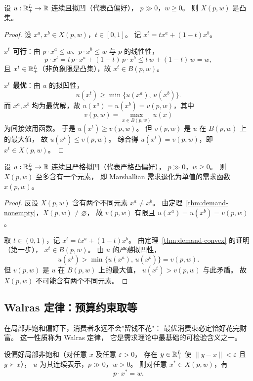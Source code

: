 \begin{theorem}[凸偏好下需求对应为凸集]\label{thm:demand-convex}
设 $u:\mathbb{R}^L_+\to\mathbb{R}$ 连续且拟凹（代表凸偏好），
$p\gg 0$，$w\ge 0$。
则 $X(p,w)$ 是凸集。
\end{theorem}

\begin{proof}
设 $x^a, x^b\in X(p,w)$，$t\in[0,1]$。
记 $x^t=tx^a+(1-t)x^b$。

\textbf{$x^t$ 可行}：由 $p\cdot x^a\le w$、$p\cdot x^b\le w$ 与 $p$ 的线性性，
\[
  p\cdot x^t = t\,p\cdot x^a + (1-t)\,p\cdot x^b \le t\,w+(1-t)\,w = w,
\]
且 $x^t\in\mathbb{R}^L_+$（非负象限是凸集），故 $x^t\in B(p,w)$。

\textbf{$x^t$ 最优}：由 $u$ 的拟凹性，
\[
  u(x^t) \ge \min\bigl\{u(x^a),\,u(x^b)\bigr\}.
\]
而 $x^a, x^b$ 均为最优解，故 $u(x^a)=u(x^b)=v(p,w)$，其中
\[
  v(p,w)=\max_{x\in B(p,w)}u(x)
\]
为间接效用函数。
于是 $u(x^t)\ge v(p,w)$。
但 $v(p,w)$ 是 $u$ 在 $B(p,w)$ 上的最大值，
故 $u(x^t)\le v(p,w)$。
综合得 $u(x^t)=v(p,w)$，即 $x^t\in X(p,w)$。
\end{proof}

\begin{theorem}[严格凸偏好下需求唯一]\label{thm:demand-unique}
设 $u:\mathbb{R}^L_+\to\mathbb{R}$ 连续且严格拟凹（代表严格凸偏好），
$p\gg 0$，$w\ge 0$。
则 $X(p,w)$ 至多含有一个元素，
即 Marshallian 需求退化为单值的需求函数 $x(p,w)$。
\end{theorem}

\begin{proof}
反设 $X(p,w)$ 含有两个不同元素 $x^a\neq x^b$。
由定理~\ref{thm:demand-nonempty}，$X(p,w)\neq\varnothing$，
故 $v(p,w)$ 有限且 $u(x^a)=u(x^b)=v(p,w)$。

取 $t\in(0,1)$，记 $x^t=tx^a+(1-t)x^b$。
由定理~\ref{thm:demand-convex} 的证明（第一步），
$x^t\in B(p,w)$。
由 $u$ 的\emph{严格}拟凹性，
\[
  u(x^t) > \min\bigl\{u(x^a),\,u(x^b)\bigr\} = v(p,w).
\]
但 $v(p,w)$ 是 $u$ 在 $B(p,w)$ 上的最大值，
$u(x^t)>v(p,w)$ 与此矛盾。
故 $X(p,w)$ 不可能含有两个不同元素。
\end{proof}

\subsection{Walras 定律：预算约束取等}
\label{subsec:walras-law}

在局部非饱和偏好下，消费者永远不会"留钱不花"：
最优消费束必定恰好花完财富。
这一性质称为 Walras 定律，
它是需求理论中最基础的可检验含义之一。

\begin{theorem}[Walras 定律]\label{thm:walras}
设偏好局部非饱和（对任意 $x$ 及任意 $\varepsilon>0$，
存在 $y\in\mathbb{R}^L_+$ 使 $\|y-x\|<\varepsilon$ 且 $y\succ x$），
$u$ 为其连续表示，$p\gg 0$，$w>0$。
则对任意 $x^*\in X(p,w)$，有
\[
  p\cdot x^* = w.
\]
\end{theorem}

